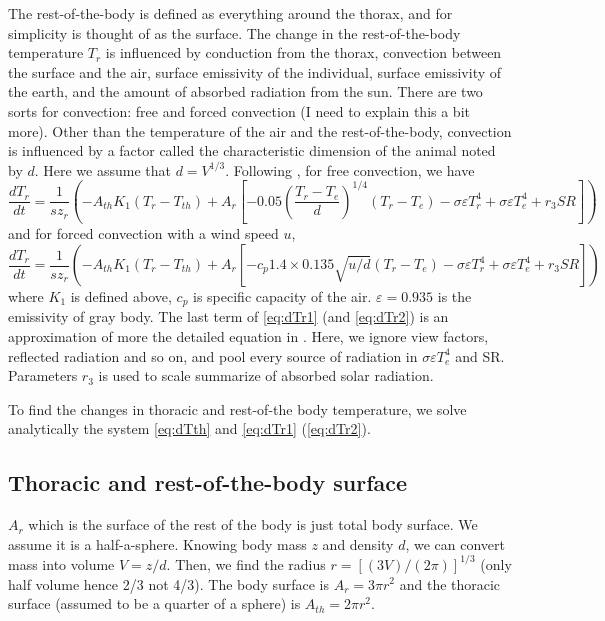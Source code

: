 \documentclass[12pt]{article}
\begin{document}
The rest-of-the-body is defined as everything around the thorax, and for simplicity is thought of as the surface.
The change in the rest-of-the-body temperature $T_r$ is influenced by conduction from the thorax, convection between the surface and the air, surface emissivity of the individual, surface emissivity of the earth, and the amount of absorbed radiation from the sun.
There are two sorts for convection: free and forced convection (I need to explain this a bit more).
Other than the temperature of the air and the rest-of-the-body, convection is influenced by a factor called the characteristic dimension of the animal noted by $d$.
Here we assume that $d = V^{1/3}$.  
Following \citet{Campbell2012}, for free convection, we have
\begin{equation} \label{eq:dTr1}
	\frac{dT_{r}}{dt} = \frac{1}{s z_{r}} \left( - A_{th} K_1(T_r - T_{th}) + A_r \left[ -  0.05 \left(\frac{T_r - T_e}{d}\right)^{1/4} (T_r- T_e) - \sigma \varepsilon T_r^4 + \sigma \varepsilon T_e^4  + r_3 SR  \right] \right)
\end{equation}
and for forced convection with a wind speed $u$,
\begin{equation} \label{eq:dTr2}
	\frac{dT_{r}}{dt} = \frac{1}{s z_{r}} \left( - A_{th} K_1(T_r - T_{th}) + A_r \left[ - c_p 1.4 \times 0.135 \sqrt{u/d} (T_r- T_e) - \sigma \varepsilon T_r^4 + \sigma \varepsilon T_e^4  + r_3 SR  \right] \right)
\end{equation} 
where $K_1$ is defined above, $c_p$ is specific capacity of the air. 
$\varepsilon = 0.935$  is the emissivity of gray body.
The last term of \cref{eq:dTr1} (and \cref{eq:dTr2})  is an approximation of more the detailed equation in \citet{Campbell2012}.
Here, we ignore view factors, reflected radiation and so on, and pool every source of radiation in $ \sigma \varepsilon T_e^4$ and SR. 
Parameters $r_3$ is used to scale summarize of absorbed solar radiation.

To find the changes in thoracic and rest-of-the body  temperature, we solve analytically the system \cref{eq:dTth} and  \cref{eq:dTr1} (\cref{eq:dTr2}).

\subsection*{Thoracic and rest-of-the-body surface}
$A_r$ which is the surface of the rest of the body is just total body surface.
We assume it is a half-a-sphere.
Knowing body mass $z$ and density $d$, we can convert mass into volume $ V = z/d$.
Then, we find the radius $r = [(3V)/(2 \pi)]^{1/3}$ (only half volume hence 2/3 not 4/3).
The body surface is   $A_r = 3 \pi r^2$ and the thoracic surface (assumed to be a quarter of a sphere) is $A_{th} = 2 \pi r^2$. 
\end{document}
